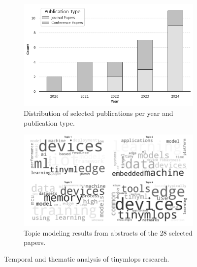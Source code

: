 \begin{figure}[htbp]
    \centering
    \begin{subfigure}{0.49\textwidth}
        \centering
        \includegraphics[width=\textwidth]{figs/research_results/publications-stats.png}
        \caption[Publication distribution (2020-2024)]{Distribution of selected publications per year and publication type.}
        \label{fig:publication-stats}
    \end{subfigure}
    \hfill 
    \begin{subfigure}{0.49\textwidth}
        \centering
        \includegraphics[width=\textwidth]{figs/research_results/topic_modelling.png}
        \caption[Topic modeling of research abstracts]{Topic modeling results from abstracts of the 28 selected papers.}
        \label{fig:TopicModelling}
    \end{subfigure}
    \caption{Temporal and thematic analysis of \gls{tinymlops} research.}
    \label{fig:combined-figures}
\end{figure}

